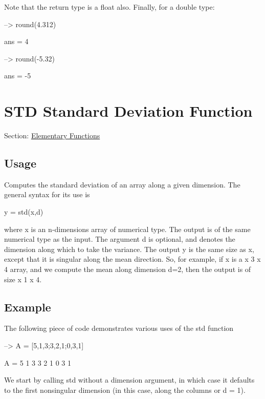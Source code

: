 Note that the return type is a {\ttfamily float} also. Finally, for a {\ttfamily double} type\-:


\begin{DoxyVerbInclude}
--> round(4.312)

ans = 
 4 

--> round(-5.32)

ans = 
 -5 
\end{DoxyVerbInclude}
 \hypertarget{elementary_std}{}\section{S\-T\-D Standard Deviation Function}\label{elementary_std}
Section\-: \hyperlink{sec_elementary}{Elementary Functions} \hypertarget{vtkwidgets_vtkxyplotwidget_Usage}{}\subsection{Usage}\label{vtkwidgets_vtkxyplotwidget_Usage}
Computes the standard deviation of an array along a given dimension. The general syntax for its use is \begin{DoxyVerb}  y = std(x,d)
\end{DoxyVerb}
 where {\ttfamily x} is an {\ttfamily n}-\/dimensions array of numerical type. The output is of the same numerical type as the input. The argument {\ttfamily d} is optional, and denotes the dimension along which to take the variance. The output {\ttfamily y} is the same size as {\ttfamily x}, except that it is singular along the mean direction. So, for example, if {\ttfamily x} is a { x 3 x 4} array, and we compute the mean along dimension {\ttfamily d=2}, then the output is of size { x 1 x 4}. \hypertarget{variables_struct_Example}{}\subsection{Example}\label{variables_struct_Example}
The following piece of code demonstrates various uses of the {\ttfamily std} function


\begin{DoxyVerbInclude}
--> A = [5,1,3;3,2,1;0,3,1]

A = 
 5 1 3 
 3 2 1 
 0 3 1 
\end{DoxyVerbInclude}


We start by calling {\ttfamily std} without a dimension argument, in which case it defaults to the first nonsingular dimension (in this case, along the columns or {\ttfamily d = 1}).


